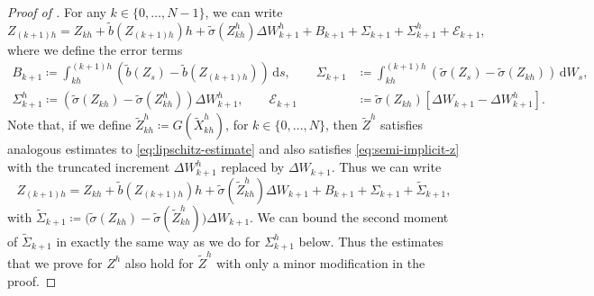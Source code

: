 \documentclass[onseside, final]{amsart}
\theoremstyle{definition}
\newcommand{\D}{\,\mathrm{d}}
\numberwithin{equation}{section}
\begin{document}
\begin{proof}[Proof of ]
			For any $k \in \{0, \dotsc, N - 1\}$, we can write
			\begin{equation}
				 Z_{(k+1)h} =  Z_{kh} + \tilde b(Z_{(k+1)h})h+ \tilde \sigma(Z^{h}_{kh})\Delta W^h_{k + 1} +B_{k + 1} +\Sigma_{k + 1} + \Sigma^h_{k + 1} + \mathcal E_{k + 1},
			\end{equation}
			where we define the error terms
			\begin{equation}
				\begin{aligned}
					B_{k + 1} \coloneqq \int_{kh}^{(k+1)h} (\tilde b(Z_s)-\tilde b(Z_{(k+1)h}))\D s, \qquad 
					\Sigma_{k + 1} & \coloneqq \int_{kh}^{(k+1)h} (\tilde \sigma(Z_s)-\tilde \sigma(Z_{kh}))\D W_s,\\
					\Sigma^h_{k + 1} \coloneqq  (\tilde \sigma(Z_{kh})-\tilde \sigma(Z^h_{kh}))\Delta W^h_{k + 1}, \qquad
					\mathcal E_{k + 1} & \coloneqq \tilde \sigma(Z_{kh})[\Delta W_{k + 1} - \Delta W^h_{k + 1}].
				\end{aligned}
			\end{equation}
			Note that, if we define  $\tilde Z^h_{kh} \coloneqq G(\tilde X^h_{kh})$, for $k \in \{0, \dotsc, N\}$, then $\tilde Z^h$ satisfies analogous estimates to \eqref{eq:lipschitz-estimate} and also satisfies \eqref{eq:semi-implicit-z} with the truncated increment $\Delta W^h_{k + 1}$ replaced by $\Delta W_{k + 1}$. Thus we can write
			\begin{equation}
				Z_{(k+1)h} =  Z_{kh} + \tilde b(Z_{(k+1)h})h+ \tilde \sigma(\tilde Z^{h}_{kh})\Delta W_{k + 1} +B_{k + 1} +\Sigma_{k + 1} + \tilde{\Sigma}_{k + 1},
			\end{equation}
			with $\tilde{\Sigma}_{k + 1} \coloneqq \big(\tilde \sigma (Z_{kh}) - \tilde \sigma(\tilde Z^h_{kh})\big)\Delta W_{k + 1}$. We can bound the second moment of $\tilde \Sigma_{k + 1}$ in exactly the same way as we do for $\Sigma^h_{k + 1}$ below. Thus the estimates that we prove for $Z^h$ also hold for $\tilde Z^h$ with only a minor modification in the proof.
			

\end{proof}
\end{document}
